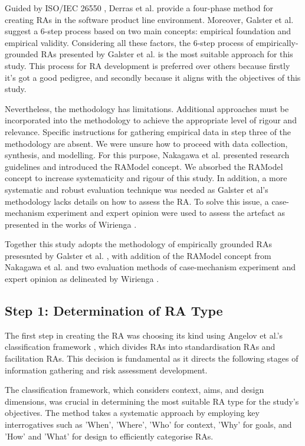 \documentclass[journal]{IEEEtran}
\begin{document}
Guided by ISO/IEC 26550 \cite{wg2015iso}, Derras et al. \cite{Derras} provide a four-phase method for creating RAs in the software product line environment. Moreover, Galster et al. \cite{GALSTER2011Empirically} suggest a 6-step process based on two main concepts: empirical foundation and empirical validity. Considering all these factors, the 6-step process of empirically-grounded RAs presented by Galster et al. is the most suitable approach for this study. This process for RA development is preferred over others because firstly it's got a good pedigree, and secondly because it aligns with the objectives of this study.

Nevertheless, the methodology has limitations. Additional approaches must be incorporated into the methodology to achieve the appropriate level of rigour and relevance. Specific instructions for gathering empirical data in step three of the methodology are absent. We were unsure how to proceed with data collection, synthesis, and modelling. For this purpose, Nakagawa et al. \cite{Nakagawa} presented research guidelines and introduced the RAModel concept. We absorbed the RAModel concept to increase systematicity and rigour of this study. In addition, a more systematic and robust evaluation technique was needed as Galster et al's methodology lacks details on how to assess the RA. To solve this issue, a case-mechanism experiment and expert opinion were used to assess the artefact as presented in the works of Wirienga \cite{wieringa2014design}.

Together this study adopts the methodology of empirically grounded RAs presesnted by Galster et al. \cite{GALSTER2011Empirically}, with addition of the RAModel concept from Nakagawa et al. \cite{nakagawa2012ramodel} and two evaluation methods of case-mechanism experiment and expert opinion as delineated by Wirienga \cite{wieringa2014design}. 


\subsection{Step 1: Determination of RA Type}

The first step in creating the RA was choosing its kind using Angelov et al.'s classification framework \cite{angelov2009classification}, which divides RAs into standardisation RAs and facilitation RAs. This decision is fundamental as it directs the following stages of information gathering and risk assessment development. 

The classification framework, which considers context, aims, and design dimensions, was crucial in determining the most suitable RA type for the study's objectives. The method takes a systematic approach by employing key interrogatives such as 'When', 'Where', 'Who' for context, 'Why' for goals, and 'How' and 'What' for design to efficiently categorise RAs.
\end{document}
